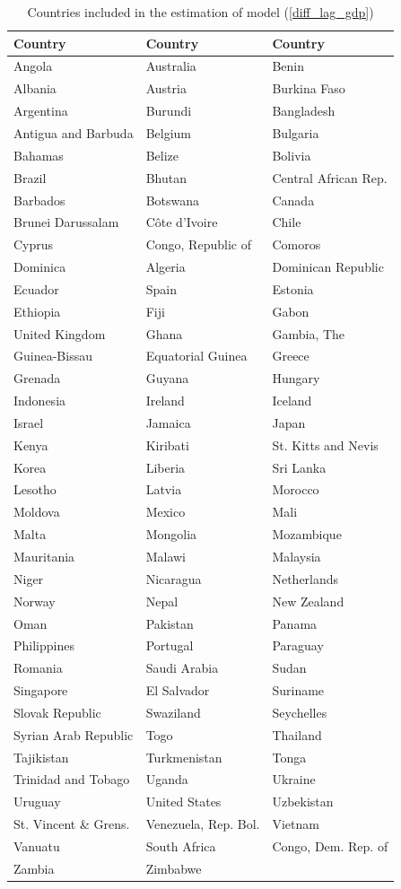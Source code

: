 \begin{appendix}
\begin{table}[h!]
    \caption{Countries included in the estimation of model (\ref{diff_lag_gdp})}\label{dynamic_list_countries}
\centering
\begin{tabular}{l l l}
\hline
Country & Country & Country \\
\hline
Angola & Australia & Benin \\
Albania & Austria & Burkina Faso \\
Argentina & Burundi & Bangladesh \\
Antigua and Barbuda & Belgium & Bulgaria \\
Bahamas & Belize & Bolivia \\
Brazil & Bhutan & Central African Rep. \\
Barbados & Botswana & Canada \\
Brunei Darussalam & Côte d'Ivoire & Chile \\
Cyprus & Congo, Republic of & Comoros \\
Dominica & Algeria & Dominican Republic \\
Ecuador & Spain & Estonia \\
Ethiopia & Fiji & Gabon \\
United Kingdom & Ghana & Gambia, The \\
Guinea-Bissau & Equatorial Guinea & Greece \\
Grenada & Guyana & Hungary \\
Indonesia & Ireland & Iceland \\
Israel & Jamaica & Japan \\
Kenya & Kiribati & St. Kitts and Nevis \\
Korea & Liberia & Sri Lanka \\
Lesotho & Latvia & Morocco \\
Moldova & Mexico & Mali \\
Malta & Mongolia & Mozambique \\
Mauritania & Malawi & Malaysia \\
Niger & Nicaragua & Netherlands \\
Norway & Nepal & New Zealand \\
Oman & Pakistan & Panama \\
Philippines & Portugal & Paraguay \\
Romania & Saudi Arabia & Sudan \\
Singapore & El Salvador & Suriname \\
Slovak Republic & Swaziland & Seychelles \\
Syrian Arab Republic & Togo & Thailand \\
Tajikistan & Turkmenistan & Tonga \\
Trinidad and Tobago & Uganda & Ukraine \\
Uruguay & United States & Uzbekistan \\
St. Vincent \& Grens. & Venezuela, Rep. Bol. & Vietnam \\
Vanuatu & South Africa & Congo, Dem. Rep. of \\
Zambia & Zimbabwe & \\
\hline
\end{tabular}
\end{table}




\end{appendix}
